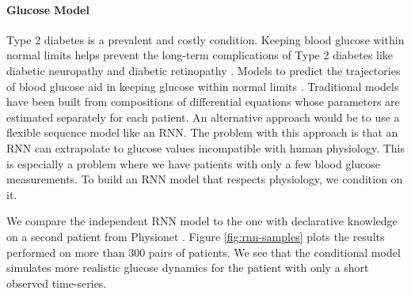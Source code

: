 \paragraph{Glucose Model}
Type 2 diabetes is a prevalent and costly condition.
Keeping blood glucose within normal limits helps prevent the
long-term complications of Type 2 diabetes like diabetic neuropathy and diabetic retinopathy \citep{brownlee2006glycemic}. Models to predict the trajectories of blood glucose aid in keeping glucose within
normal limits \citep{zeevi2015personalized}. Traditional models have been built from compositions of differential equations \citep{albers2017personalized,levine2017offline} whose parameters are estimated separately for each patient. An alternative approach would be to use a flexible sequence model like an RNN. The problem with this approach is that an RNN can extrapolate to glucose values incompatible with human physiology. This is especially a problem where we have patients with only a few blood glucose measurements. To build an RNN model that respects physiology, we condition on it.

We compare the independent RNN model to the one with declarative knowledge on a second patient from Physionet \citep{moody2001physionet}.
Figure \ref{fig:rnn-samples} plots the results performed on more than 300 pairs of patients.
We see that the conditional model simulates
more realistic glucose dynamics for the patient 
with only a short observed time-series.




